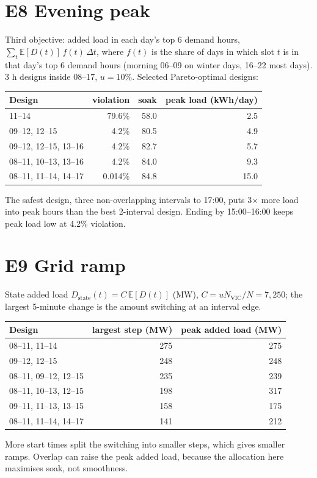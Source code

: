 \documentclass[10.5pt,a4paper]{article}
\begin{document}
\section{E8 Evening peak}
Third objective: added load in each day's top 6 demand hours,
\(\sum_t \mathbb E[D(t)]\,f(t)\,\Delta t\), where \(f(t)\) is the share of days in which slot \(t\) is in that day's top
6 demand hours (morning 06--09 on winter days, 16--22 most days). 3 h designs inside 08--17, \(u=10\%\).
Selected Pareto-optimal designs:
\begin{center}\small
\begin{tabular}{lrrr}
\toprule
Design & violation & soak & peak load (kWh/day)\\
\midrule
11--14 & 79.6\% & 58.0 & 2.5\\
09--12, 12--15 & 4.2\% & 80.5 & 4.9\\
09--12, 12--15, 13--16 & 4.2\% & 82.7 & 5.7\\
08--11, 10--13, 13--16 & 4.2\% & 84.0 & 9.3\\
08--11, 11--14, 14--17 & 0.014\% & 84.8 & 15.0\\
\bottomrule
\end{tabular}
\end{center}
The safest design, three non-overlapping intervals to 17:00, puts 3\(\times\) more load into peak
hours than the best 2-interval design. Ending by 15:00--16:00 keeps peak load low at 4.2\% violation.

\section{E9 Grid ramp}
State added load \(D_{\text{state}}(t)=C\,\mathbb E[D(t)]\) (MW), \(C=uN_{\mathrm{VIC}}/N=7{,}250\);
the largest 5-minute change is the amount switching at an interval edge.
\begin{center}\small
\begin{tabular}{lrr}
\toprule
Design & largest step (MW) & peak added load (MW)\\
\midrule
08--11, 11--14 & 275 & 275\\
09--12, 12--15 & 248 & 248\\
08--11, 09--12, 12--15 & 235 & 239\\
08--11, 10--13, 12--15 & 198 & 317\\
09--11, 11--13, 13--15 & 158 & 175\\
08--11, 11--14, 14--17 & 141 & 212\\
\bottomrule
\end{tabular}
\end{center}
More start times split the switching into smaller steps, which gives smaller ramps. Overlap can
raise the peak added load, because the allocation here maximises soak, not smoothness.
\end{document}
